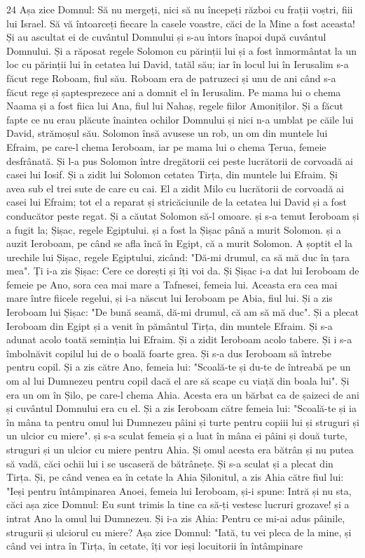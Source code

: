 \par 24 Așa zice Domnul: Să nu mergeți, nici să nu începeți război cu frații voștri, fiii lui Israel. Să vă întoarceți fiecare la casele voastre, căci de la Mine a fost aceasta! Și au ascultat ei de cuvântul Domnului și s-au întors înapoi după cuvântul Domnului. Și a răposat regele Solomon cu părinții lui și a fost înmormântat la un loc cu părinții lui în cetatea lui David, tatăl său; iar în locul lui în Ierusalim s-a făcut rege Roboam, fiul său. Roboam era de patruzeci și unu de ani când s-a făcut rege și șaptesprezece ani a domnit el în Ierusalim. Pe mama lui o chema Naama și a fost fiica lui Ana, fiul lui Nahaș, regele fiilor Amoniților. Și a făcut fapte ce nu erau plăcute înaintea ochilor Domnului și nici n-a umblat pe căile lui David, strămoșul său. Solomon însă avusese un rob, un om din muntele lui Efraim, pe care-l chema Ieroboam, iar pe mama lui o chema Țerua, femeie desfrânată. Și l-a pus Solomon între dregătorii cei peste lucrătorii de corvoadă ai casei lui Iosif. Și a zidit lui Solomon cetatea Tirța, din muntele lui Efraim. Și avea sub el trei sute de care cu cai. El a zidit Milo cu lucrătorii de corvoadă ai casei lui Efraim; tot el a reparat și stricăciunile de la cetatea lui David și a fost conducător peste regat. Și a căutat Solomon să-l omoare. și s-a temut Ieroboam și a fugit la; Șișac, regele Egiptului. și a fost la Șișac până a murit Solomon. și a auzit Ieroboam, pe când se afla încă în Egipt, că a murit Solomon. A șoptit el la urechile lui Șișac, regele Egiptului, zicând: "Dă-mi drumul, ca să mă duc în țara mea". Ți i-a zis Șișac: Cere ce dorești și îți voi da. Și Șișac i-a dat lui Ieroboam de femeie pe Ano, sora cea mai mare a Tafnesei, femeia lui. Aceasta era cea mai mare între fiicele regelui, și i-a născut lui Ieroboam pe Abia, fiul lui. Și a zis Ieroboam lui Șișac: "De bună seamă, dă-mi drumul, că am să mă duc". Și a plecat Ieroboam din Egipt și a venit în pământul Tirța, din muntele Efraim. Și s-a adunat acolo toată seminția lui Efraim. Și a zidit Ieroboam acolo tabere. Și i s-a îmbolnăvit copilul lui de o boală foarte grea. Și s-a dus Ieroboam să întrebe pentru copil. Și a zis către Ano, femeia lui: "Scoală-te și du-te de întreabă pe un om al lui Dumnezeu pentru copil dacă el are să scape cu viață din boala lui". Și era un om în Șilo, pe care-l chema Ahia. Acesta era un bărbat ca de șaizeci de ani și cuvântul Domnului era cu el. Și a zis Ieroboam către femeia lui: "Scoală-te și ia în mâna ta pentru omul lui Dumnezeu pâini și turte pentru copiii lui și struguri și un ulcior cu miere". și s-a sculat femeia și a luat în mâna ei pâini și două turte, struguri și un ulcior cu miere pentru Ahia. Și omul acesta era bătrân și nu putea să vadă, căci ochii lui i se uscaseră de bătrânețe. Și s-a sculat și a plecat din Tirța. Și, pe când venea ea în cetate la Ahia Șilonitul, a zis Ahia către fiul lui: "Ieși pentru întâmpinarea Anoei, femeia lui Ieroboam, și-i spune: Intră și nu sta, căci așa zice Domnul: Eu sunt trimis la tine ca să-ți vestesc lucruri grozave! și a intrat Ano la omul lui Dumnezeu. Și i-a zis Ahia: Pentru ce mi-ai adus pâinile, strugurii și ulciorul cu miere? Așa zice Domnul: "Iată, tu vei pleca de la mine, și când vei intra în Tirța, în cetate, îți vor ieși locuitorii în întâmpinare 